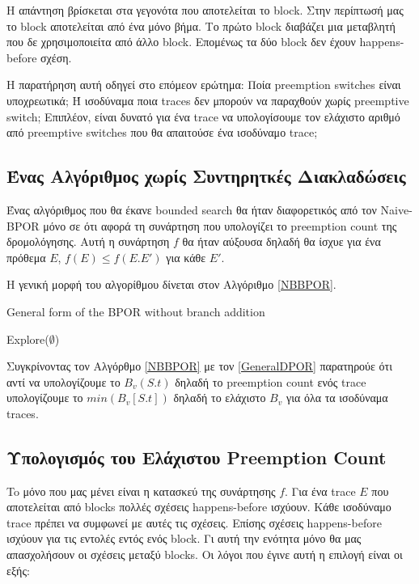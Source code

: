 Η απάντηση βρίσκεται στα γεγονότα που αποτελείται το block. Στην περίπτωσή μας το block αποτελείται από 
ένα μόνο βήμα. Το πρώτο block διαβάζει μια μεταβλητή που δε χρησιμοποιείτα από άλλο block. Επομένως τα δύο block δεν έχουν happens-before
σχέση.

Η παρατήρηση αυτή οδηγεί στο επόμεον ερώτημα: Ποία preemption switches είναι υποχρεωτικά; Ή ισοδύναμα ποια traces δεν μπορούν να παραχθούν
χωρίς preemptive switch; Επιπλέον, είναι δυνατό για ένα trace να υπολογίσουμε τον ελάχιστο αριθμό από preemptive switches που θα απαιτούσε ένα
ισοδύναμο trace;

\subsection{Ένας Αλγόριθμος χωρίς Συντηρητκές Διακλαδώσεις}
Ένας αλγόριθμος που θα έκανε bounded search θα ήταν διαφορετικός από τον Naive-BPOR μόνο σε ότι αφορά τη συνάρτηση που υπολογίζει το
preemption count της δρομολόγησης. Αυτή η συνάρτηση $f$ θα ήταν αύξουσα δηλαδή θα ίσχυε για ένα πρόθεμα $E$, $f(E) \leq f(E.E')$ για κάθε $E'$.

Η γενική μορφή του αλγορίθμου δίνεται στον Αλγόριθμο \ref{NBBPOR}.

\begin{algorithm}[H]
    \SetAlgoLined
    \caption{General form of the BPOR without branch addition}
    \label{NBBPOR}
    Explore($\emptyset$)\;
\end{algorithm}

Συγκρίνοντας τον Αλγόρθμο \ref{NBBPOR} με τον \ref{GeneralDPOR} παρατηρούε ότι αντί να υπολογίζουμε το $B_v(S.t)$ δηλαδή το preemption
count ενός trace υπολογίζουμε το $min(B_v[S.t])$ δηλαδή το ελάχιστο $B_v$ για όλα τα ισοδύναμα traces.

\subsection{Υπολογισμός του Ελάχιστου Preemption Count}
To μόνο που μας μένει είναι η κατασκεύ της συνάρτησης $f$. Για ένα trace $E$ που αποτελείται από blocks πολλές σχέσεις 
happens-before ισχύουν. Κάθε ισοδύναμο trace πρέπει να συμφωνεί με αυτές τις σχέσεις. Επίσης σχέσεις happens-before ισχύουν
για τις εντολές εντός ενός block. Γι αυτή την ενότητα μόνο θα μας απασχολήσουν οι σχέσεις μεταξύ blocks.
Οι λόγοι που έγινε αυτή η επιλογή είναι οι εξής:

